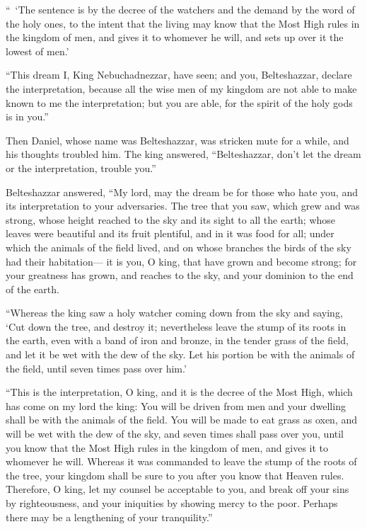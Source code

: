 \myverse{}“ ‘The sentence is by the decree of the watchers and
the demand by the word of the holy ones, to the intent that the living may know that the Most High rules
in the kingdom of men, and gives it to whomever he will, and sets up over it the lowest of men.’

\myverse{}“This dream I, King Nebuchadnezzar, have seen; and
you, Belteshazzar, declare the interpretation, because all the wise men of my kingdom are not able to
make known to me the interpretation; but you are able, for the spirit of the holy gods is in you.”

\myverse{}Then Daniel, whose name was Belteshazzar, was stricken
mute for a while, and his thoughts troubled him. The king answered, “Belteshazzar, don’t let the dream
or the interpretation, trouble you.”

Belteshazzar answered, “My lord, may the dream be for those who hate you, and
its interpretation to your adversaries.
\myverse{}The tree that you saw, which grew and was strong, whose height reached to
the sky and its sight to all the earth;
\myverse{}whose leaves were beautiful and its fruit plentiful, and in it was food for
all; under which the animals of the field lived, and on whose branches the birds of the sky had their
habitation—
\myverse{}it is you, O king, that have grown and become strong; for your greatness has
grown, and reaches to the sky, and your dominion to the end of the earth.

\myverse{}“Whereas the king saw a holy watcher coming down from
the sky and saying, ‘Cut down the tree, and destroy it; nevertheless leave the stump of its roots in the
earth, even with a band of iron and bronze, in the tender grass of the field, and let it be wet with the
dew of the sky. Let his portion be with the animals of the field, until seven times pass over him.’

\myverse{}“This is the interpretation, O king, and it is the
decree of the Most High, which has come on my lord the king:
\myverse{}You will be driven from men and your dwelling shall be with the animals of
the field. You will be made to eat grass as oxen, and will be wet with the dew of the sky, and seven times
shall pass over you, until you know that the Most High rules in the kingdom of men, and gives it to whomever
he will.
\myverse{}Whereas it was commanded to leave the stump of the roots of the tree, your
kingdom shall be sure to you after you know that Heaven rules.
\myverse{}Therefore, O king, let my counsel be acceptable to you, and break off your
sins by righteousness, and your iniquities by showing mercy to the poor. Perhaps there may be a lengthening
of your tranquility.”


